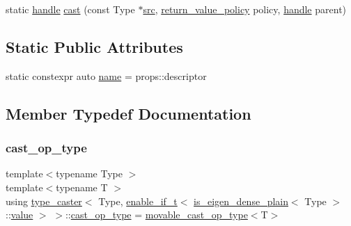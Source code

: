 \begin{DoxyCompactItemize}
\item 
static \mbox{\hyperlink{classhandle}{handle}} \mbox{\hyperlink{structtype__caster_3_01_type_00_01enable__if__t_3_01is__eigen__dense__plain_3_01_type_01_4_1_1value_01_4_01_4_ab840bfe04e47c2eed741308eff51e954}{cast}} (const Type $\ast$\mbox{\hyperlink{_s_d_l__opengl__glext_8h_a72e0fdf0f845ded60b1fada9e9195cd7}{src}}, \mbox{\hyperlink{detail_2common_8h_adde72ab1fb0dd4b48a5232c349a53841}{return\+\_\+value\+\_\+policy}} policy, \mbox{\hyperlink{classhandle}{handle}} parent)
\end{DoxyCompactItemize}
\subsection*{Static Public Attributes}
\begin{DoxyCompactItemize}
\item 
static constexpr auto \mbox{\hyperlink{structtype__caster_3_01_type_00_01enable__if__t_3_01is__eigen__dense__plain_3_01_type_01_4_1_1value_01_4_01_4_af7df5aa39b76507a1c06399841c3dd96}{name}} = props\+::descriptor
\end{DoxyCompactItemize}


\subsection{Member Typedef Documentation}
\mbox{\label{structtype__caster_3_01_type_00_01enable__if__t_3_01is__eigen__dense__plain_3_01_type_01_4_1_1value_01_4_01_4_a3155cecdaa64bdd698c332239d9af2e4}} 
\subsubsection{\texorpdfstring{cast\_op\_type}{cast\_op\_type}}
{\footnotesize\ttfamily template$<$typename Type $>$ \\
template$<$typename T $>$ \\
using \mbox{\hyperlink{classtype__caster}{type\+\_\+caster}}$<$ Type, \mbox{\hyperlink{detail_2common_8h_a012819c9e8b5e04872a271f50f8b8196}{enable\+\_\+if\+\_\+t}}$<$ \mbox{\hyperlink{eigen_8h_a93c6985faade6e9052f9e0917826b26d}{is\+\_\+eigen\+\_\+dense\+\_\+plain}}$<$ Type $>$\+::\mbox{\hyperlink{_s_d_l__opengl__glext_8h_a8ad81492d410ff2ac11f754f4042150f}{value}} $>$ $>$\+::\mbox{\hyperlink{structtype__caster_3_01_type_00_01enable__if__t_3_01is__eigen__dense__plain_3_01_type_01_4_1_1value_01_4_01_4_a3155cecdaa64bdd698c332239d9af2e4}{cast\+\_\+op\+\_\+type}} =  \mbox{\hyperlink{cast_8h_a32fe7f4c6e2ae670844b4f3ab92ba3b8}{movable\+\_\+cast\+\_\+op\+\_\+type}}$<$T$>$}


